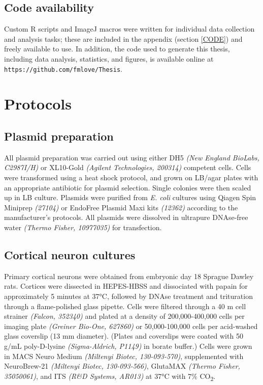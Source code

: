 \documentclass[
  12pt,
  a4paper,
]{book}
\begin{document}
\subsection{Code availability}\label{code-availability}

Custom R scripts and ImageJ macros were written for individual data collection and analysis tasks; these are included in the appendix (section \ref{CODE}) and freely available to use. In addition, the code used to generate this thesis, including data analysis, statistics, and figures, is available online at \texttt{https://github.com/fmlove/Thesis}.

\section{Protocols}\label{protocols}

\subsection{Plasmid preparation}\label{plasmid-prep}

All plasmid preparation was carried out using either DH5\textalpha{} \emph{(New England BioLabs, C2987I/H)} or XL10-Gold \emph{(Agilent Technologies, 200314)} competent cells. Cells were transformed using a heat shock protocol, and grown on LB/agar plates with an appropriate antibiotic for plasmid selection. Single colonies were then scaled up in LB culture. Plasmids were purified from \emph{E. coli} cultures using Qiagen Spin Miniprep \emph{(27104)} or EndoFree Plasmid Maxi kits \emph{(12362)} according to the manufacturer's protocols. All plasmids were dissolved in ultrapure DNAse-free water \emph{(Thermo Fisher, 10977035)} for transfection.

\subsection{Cortical neuron cultures}\label{CNC}

Primary cortical neurons were obtained from embryonic day 18 Sprague Dawley rats. Cortices were dissected in HEPES-HBSS and dissociated with papain for approximately 5 minutes at 37°C, followed by DNAse treatment and trituration through a flame-polished glass pipette. Cells were filtered through a 40 \textmu{}m cell strainer \emph{(Falcon, 352340)} and plated at a density of 200,000-400,000 cells per imaging plate \emph{(Greiner Bio-One, 627860)} or 50,000-100,000 cells per acid-washed glass coverslip (13 mm diameter). (Plates and coverslips were coated with 50 \textmu{}g/mL poly-D-lysine \emph{(Sigma-Aldrich, P1149)} in borate buffer.) Cells were grown in MACS Neuro Medium \emph{(Miltenyi Biotec, 130-093-570)}, supplemented with NeuroBrew-21 \emph{(Miltenyi Biotec, 130-093-566)}, GlutaMAX \emph{(Thermo Fisher, 35050061)}, and ITS \emph{(R\&D Systems, AR013)} at 37°C with 7\% CO\textsubscript{2}.
\end{document}
